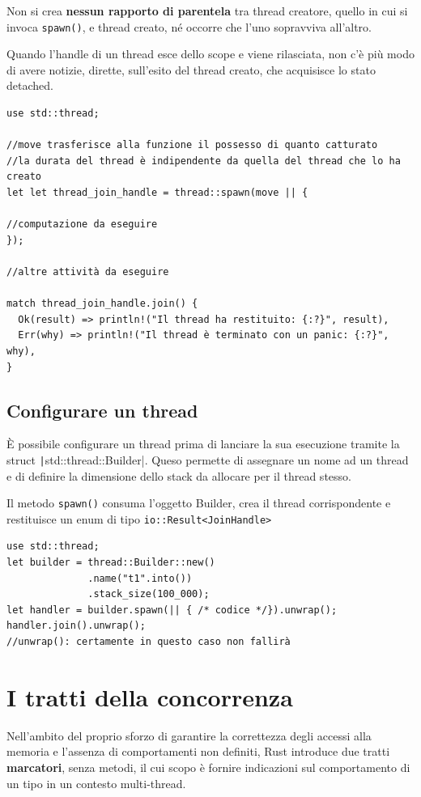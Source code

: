 Non si crea \textbf{nessun rapporto di parentela} tra thread creatore, quello in cui si invoca
\verb|spawn()|, e thread creato, né occorre che l'uno sopravviva all'altro.

Quando l'handle di un thread esce dello scope e viene rilasciata, non c'è più
modo di avere notizie, dirette, sull'esito del thread creato, che acquisisce lo
stato detached.

\begin{verbatim}
use std::thread;

//move trasferisce alla funzione il possesso di quanto catturato
//la durata del thread è indipendente da quella del thread che lo ha creato
let let thread_join_handle = thread::spawn(move || { 

//computazione da eseguire
});

//altre attività da eseguire 

match thread_join_handle.join() {
  Ok(result) => println!("Il thread ha restituito: {:?}", result),
  Err(why) => println!("Il thread è terminato con un panic: {:?}", why),
}
\end{verbatim}


\subsection{Configurare un thread}

È possibile configurare un thread prima di lanciare la sua esecuzione tramite la
struct \texttt|std::thread::Builder|. Queso permette di assegnare un nome
ad un thread e di definire la dimensione dello stack da allocare per il thread stesso.

Il metodo \verb|spawn()| consuma l'oggetto Builder, crea il thread corrispondente
e restituisce un enum di tipo \verb|io::Result<JoinHandle>|

\begin{verbatim}
use std::thread;
let builder = thread::Builder::new()
              .name("t1".into())
              .stack_size(100_000);
let handler = builder.spawn(|| { /* codice */}).unwrap();
handler.join().unwrap();    
//unwrap(): certamente in questo caso non fallirà
\end{verbatim}

\section{I tratti della concorrenza}

Nell'ambito del proprio sforzo di garantire la correttezza degli accessi alla
memoria e l'assenza di comportamenti non definiti, Rust introduce due tratti
\textbf{marcatori}, senza metodi, il cui scopo è fornire indicazioni sul comportamento
di un tipo in un contesto multi-thread.

